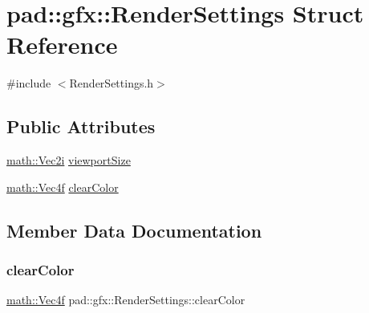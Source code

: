 \hypertarget{structpad_1_1gfx_1_1_render_settings}{}\section{pad\+:\+:gfx\+:\+:Render\+Settings Struct Reference}
\label{structpad_1_1gfx_1_1_render_settings}


{\ttfamily \#include $<$Render\+Settings.\+h$>$}

\subsection*{Public Attributes}
\begin{DoxyCompactItemize}
\item 
\mbox{\hyperlink{namespacepad_1_1math_a808a631a6bccd994f9589d7fb86bad41}{math\+::\+Vec2i}} \mbox{\hyperlink{structpad_1_1gfx_1_1_render_settings_ab4c2219069f519d8a6678fc4865da5e2}{viewport\+Size}}
\item 
\mbox{\hyperlink{namespacepad_1_1math_a4eb77014ac7b74bd24cf73bca82ac3a3}{math\+::\+Vec4f}} \mbox{\hyperlink{structpad_1_1gfx_1_1_render_settings_a720fb73ec1fafb0eb912f6870bb8a8ea}{clear\+Color}}
\end{DoxyCompactItemize}


\subsection{Member Data Documentation}
\mbox{\label{structpad_1_1gfx_1_1_render_settings_a720fb73ec1fafb0eb912f6870bb8a8ea}} 
\subsubsection{\texorpdfstring{clear\+Color}{clearColor}}
{\footnotesize\ttfamily \mbox{\hyperlink{namespacepad_1_1math_a4eb77014ac7b74bd24cf73bca82ac3a3}{math\+::\+Vec4f}} pad\+::gfx\+::\+Render\+Settings\+::clear\+Color}

\mbox{\label{structpad_1_1gfx_1_1_render_settings_ab4c2219069f519d8a6678fc4865da5e2}} 
